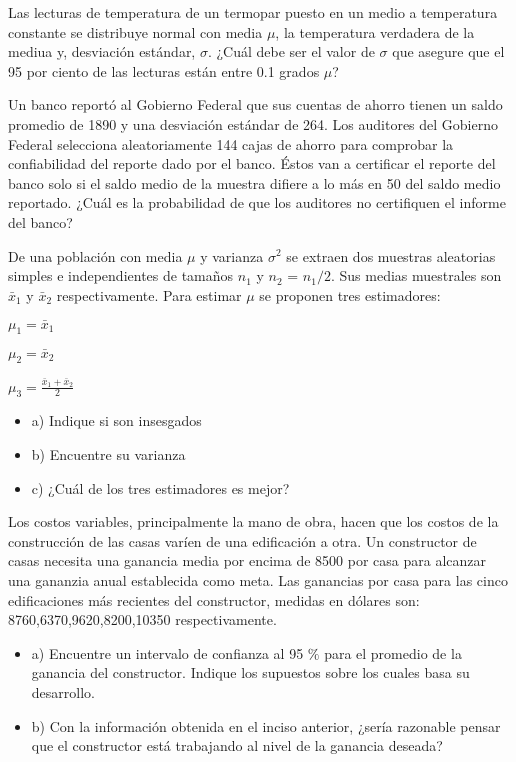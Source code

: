 \documentclass{../oxmathproblems}
\begin{document}
\begin{questions}
\miquestion Las lecturas de temperatura de un termopar puesto en un medio a temperatura constante se distribuye normal con media $\mu$, la temperatura verdadera de la mediua y, desviación estándar, $\sigma$. ¿Cuál debe ser el valor de  $\sigma$ que asegure que el 95 por ciento de las lecturas están entre 0.1 grados $\mu$? 


\miquestion Un banco reportó al Gobierno Federal que sus cuentas de ahorro tienen un saldo promedio de 1890 y una desviación estándar de 264. Los auditores del Gobierno Federal selecciona aleatoriamente 144 cajas de ahorro para comprobar la confiabilidad del reporte dado por el banco. Éstos van a certificar el reporte del banco solo si el saldo medio de la muestra difiere a lo más en 50 del saldo medio reportado. ¿Cuál es la probabilidad de que los auditores no certifiquen el informe del banco?



\miquestion De una población con media $\mu$ y varianza $\sigma^2$ se extraen dos muestras aleatorias simples e independientes de tamaños $n_1$ y $n_2$ = $n_1/2$. Sus medias muestrales son $\bar{x}_1$ y $\bar{x}_2$ respectivamente. Para estimar $\mu$ se proponen tres estimadores: 


$ \mu_1 = \bar{x}_1$

$ \mu_2 = \bar{x}_2$

$ \mu_3 =  \frac{\bar{x}_1 + \bar{x}_2}{2} $ 

\begin{itemize}
\item a) Indique si son insesgados 
\item b) Encuentre su varianza
\item c) ¿Cuál de los tres estimadores es mejor?
\end{itemize}


\miquestion Los costos variables, principalmente la mano de obra, hacen que los costos de la construcción de las casas varíen de una edificación a otra. Un constructor de casas necesita una ganancia media por encima de 8500 por casa para alcanzar una gananzia anual establecida como meta. Las ganancias por casa para las cinco edificaciones más recientes del constructor, medidas en dólares son: {8760,6370,9620,8200,10350} respectivamente.

\begin{itemize}
\item a) Encuentre un intervalo de confianza al 95 $\%$  para el promedio de la ganancia del constructor. Indique los supuestos sobre los cuales basa su desarrollo. 
\item b) Con la información obtenida en el inciso anterior, ¿sería razonable pensar que el constructor está trabajando al nivel de la ganancia deseada?
\end{itemize}


\end{questions}
\end{document}
